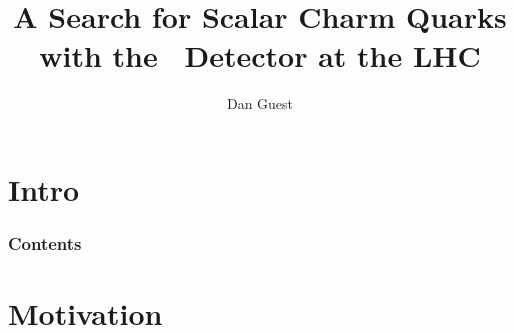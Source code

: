 \documentclass[usenames,dvipsnames]{beamer}
\title[Charmed SUSY]{A Search for Scalar Charm Quarks with the \atlas\ Detector at the LHC}
\author[dhg3]{Dan Guest}
\institute[Yale]{Yale University}
\begin{document}
\section*{Intro}

\maketitle
\begin{frame}
  \frametitle{Contents}
  \tableofcontents
\end{frame}


\section{Motivation}
\end{document}
